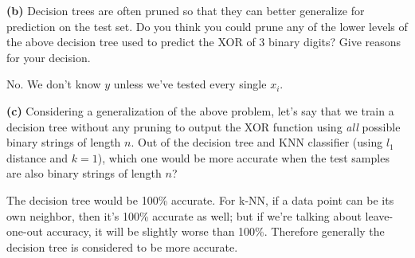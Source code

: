 \documentclass[11pt]{article}
\newcounter{marks}
\def\maxmarks#1{\extramark{#1}\addtocounter{marks}{#1}}
\def\extramark#1{
  \begin{flushright}
  [\emph{#1 points}]
  \end{flushright}
}
\renewcommand{\part}[1] {\vspace{.10in} {\bf (#1)}}
\begin{document}
\begin{center}\color{blue}
\end{center}

\part{b} Decision trees are often pruned so that they can better generalize for prediction on the test set. Do you think you could prune any of the lower levels of the above decision tree used to predict the XOR of 3 binary digits? Give reasons for your decision.
\maxmarks{2} {\color{blue} No. We don't know $y$ unless we've tested every single $x_i$.}

\part{c} Considering a generalization of the above problem, let's say that we train a decision tree without any pruning to output the XOR function using \emph{all} possible binary strings of length $n$. Out of the decision tree and KNN classifier (using $l_1$ distance and $k=1$), which one would be more accurate when the test samples are also binary strings of length $n$?
\maxmarks{2} {\color{blue} The decision tree would be 100\% accurate. For k-NN, if a data point can be its own neighbor, then it's 100\% accurate as well;
but if we're talking about leave-one-out accuracy, it will be slightly worse than 100\%. Therefore generally the decision tree is considered to be more accurate. }
\end{document}
